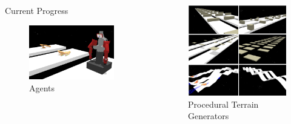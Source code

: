 \documentclass[final]{beamer}
\newlength{\sepwid}
\newlength{\onecolwid}
\begin{document}
\begin{frame}[t]
\begin{columns}[t]
\begin{column}{\onecolwid}
\begin{block}{Current Progress}
    \begin{figure}
        \includegraphics[width=0.8\linewidth]{_imgs/img_tysocmjc_agents_1.png}
        \caption{Agents}
    \end{figure}

\end{block}

\begin{column}{\sepwid}\end{column} %
\end{column} %

\begin{column}{\sepwid}\end{column} %
\begin{column}{\onecolwid} %

\begin{figure}
    \includegraphics[width=0.85\linewidth]{_imgs/img_tysocmjc_terrains.png}
    \caption{Procedural Terrain Generators}
\end{figure}


\end{column}
\end{columns}
\end{frame}
\end{document}
